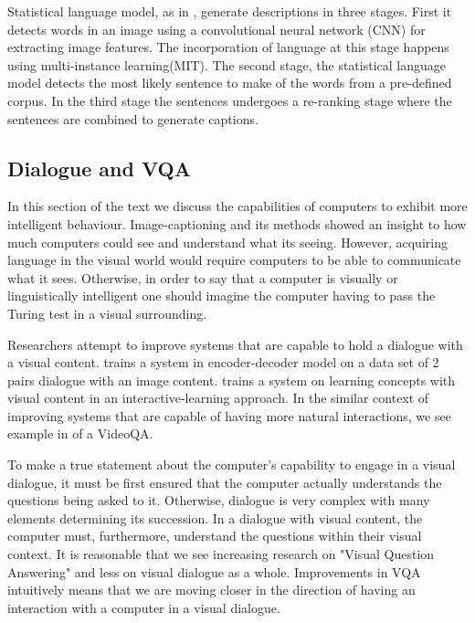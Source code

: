 Statistical language model, as in \cite{fang2015captions}, generate descriptions in three stages. First it detects words in an image using a convolutional neural network (CNN) for extracting image features. The incorporation of language at this stage happens using multi-instance learning(MIT)\cite{zhang2005multiple}. The second stage, the statistical language model detects the most likely sentence to make of the words from a pre-defined corpus. In the third stage the sentences undergoes a re-ranking stage where the sentences are combined to generate captions. 





\subsection{Dialogue and VQA}

In this section of the text we discuss the capabilities of computers to exhibit more intelligent behaviour. Image-captioning and its methods showed an insight to how much computers could see and understand what its seeing. However, acquiring language in the visual world would require computers to be able to communicate what it sees. Otherwise, in order to say that a computer is visually or linguistically intelligent one should imagine the computer having to pass the Turing test in a visual surrounding. 

Researchers attempt to improve systems that are capable to hold a dialogue with a visual content.\cite{das2017visual} trains a system in  encoder-decoder model on a data set of 2 pairs dialogue with an image content.\cite{Skoaj2011ASF} trains a system on learning concepts with visual content in an interactive-learning approach. In the similar context of improving systems that are capable of having more natural interactions, we see example in \cite{Lin2014VisualSS} of a VideoQA. 

To make a true statement about the computer's capability to engage in a visual dialogue, it must be first ensured that the computer actually understands the questions being asked to it. Otherwise, dialogue is very complex with many elements determining its succession. In a dialogue with visual content, the computer must, furthermore, understand the questions within their visual context. It is reasonable that we see increasing research on "Visual Question Answering" and less on visual dialogue as a whole. Improvements in VQA intuitively means that we are moving closer in the direction of having an interaction with a computer in a visual dialogue.  



